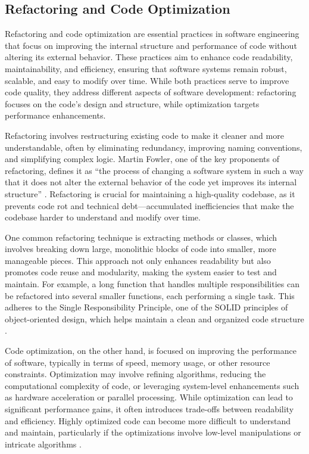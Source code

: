 \begin{refsection}
\subsection{Refactoring and Code Optimization}

Refactoring and code optimization are essential practices in software engineering that focus on improving the internal structure and performance of code without altering its external behavior. These practices aim to enhance code readability, maintainability, and efficiency, ensuring that software systems remain robust, scalable, and easy to modify over time. While both practices serve to improve code quality, they address different aspects of software development: refactoring focuses on the code's design and structure, while optimization targets performance enhancements.

Refactoring involves restructuring existing code to make it cleaner and more understandable, often by eliminating redundancy, improving naming conventions, and simplifying complex logic. Martin Fowler, one of the key proponents of refactoring, defines it as “the process of changing a software system in such a way that it does not alter the external behavior of the code yet improves its internal structure” \cite[pp.~49-52]{Fowler1999}. Refactoring is crucial for maintaining a high-quality codebase, as it prevents code rot and technical debt—accumulated inefficiencies that make the codebase harder to understand and modify over time.

One common refactoring technique is extracting methods or classes, which involves breaking down large, monolithic blocks of code into smaller, more manageable pieces. This approach not only enhances readability but also promotes code reuse and modularity, making the system easier to test and maintain. For example, a long function that handles multiple responsibilities can be refactored into several smaller functions, each performing a single task. This adheres to the Single Responsibility Principle, one of the SOLID principles of object-oriented design, which helps maintain a clean and organized code structure \cite[pp.~98-100]{Martin2022}.

Code optimization, on the other hand, is focused on improving the performance of software, typically in terms of speed, memory usage, or other resource constraints. Optimization may involve refining algorithms, reducing the computational complexity of code, or leveraging system-level enhancements such as hardware acceleration or parallel processing. While optimization can lead to significant performance gains, it often introduces trade-offs between readability and efficiency. Highly optimized code can become more difficult to understand and maintain, particularly if the optimizations involve low-level manipulations or intricate algorithms \cite[pp.~210-212]{Aho2006}.


\end{refsection}
